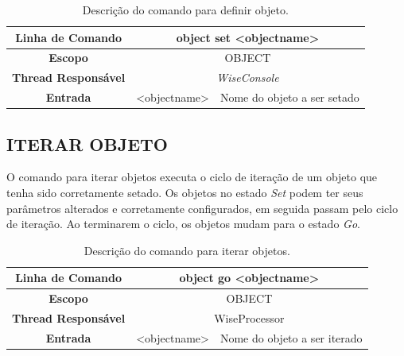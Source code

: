 \begin{center}
	\begin{table}[!htbp]
		\begin{tabularx}{\textwidth}{c|c|X}
			\toprule
			\textbf{Linha de Comando} & \multicolumn{2}{c}{object set <object\underline{\space\space}name>} \\
			\midrule
			\textbf{Escopo} & \multicolumn{2}{c}{OBJECT} \\
			\hline
			\textbf{Thread Responsável} & \multicolumn{2}{c}{\textit{WiseConsole}} \\
			\hline
			\textbf{Entrada} & <object\underline{\space\space}name> & Nome do objeto a ser setado \\
			\bottomrule
		\end{tabularx}
		\caption{Descrição do comando para definir objeto.}
		\label{tab:set_object}
	\end{table}
\end{center}

\subsection{ITERAR OBJETO}\label{sec:go_object}

O comando para iterar objetos executa o ciclo de iteração de um objeto que tenha sido corretamente setado. Os objetos no estado \textit{Set} podem ter seus parâmetros alterados e corretamente configurados, em seguida passam pelo ciclo de iteração. Ao terminarem o ciclo, os objetos mudam para o estado \textit{Go}.

\begin{center}
	\begin{table}[!htbp]
		\begin{tabularx}{\textwidth}{c|c|X}
			\toprule
			\textbf{Linha de Comando} & \multicolumn{2}{c}{object go <object\underline{\space\space}name>} \\
			\midrule
			\textbf{Escopo} & \multicolumn{2}{c}{OBJECT} \\
			\hline
			\textbf{Thread Responsável} & \multicolumn{2}{c}{WiseProcessor} \\
			\hline
			\textbf{Entrada} & <object\underline{\space\space}name> & Nome do objeto a ser iterado \\
			\bottomrule
		\end{tabularx}
		\caption{Descrição do comando para iterar objetos.}
		\label{tab:go_objectject}
	\end{table}
\end{center}

